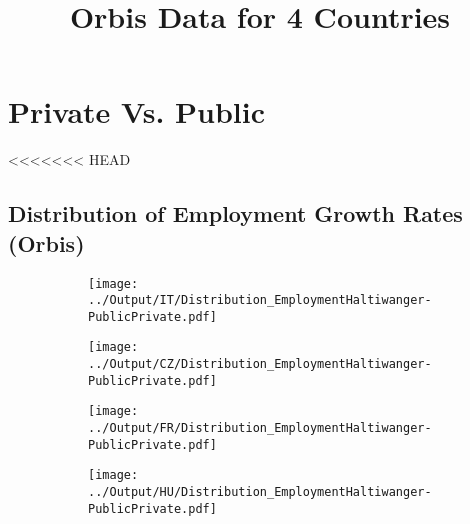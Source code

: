 \documentclass[12pt,notitlepage]{article}
\title{Orbis Data for 4 Countries}
\author{}
\date{}
\begin{document}
\maketitle
\tableofcontents
\pagebreak



\FloatBarrier
\section{Private Vs. Public} %
\label{sec:private_vs_public}
\FloatBarrier


<<<<<<< HEAD


\subsection{Distribution of Employment Growth Rates (Orbis)}
\begin{figure}[!htpb]
\centering
\begin{subfigure}{.49\textwidth}
    \centering
 \texttt{[image: ../Output/IT/Distribution\_EmploymentHaltiwanger-PublicPrivate.pdf]}
\end{subfigure}%
\begin{subfigure}{.49\textwidth}
    \centering
 \texttt{[image: ../Output/CZ/Distribution\_EmploymentHaltiwanger-PublicPrivate.pdf]}
\end{subfigure}
\begin{subfigure}{.49\textwidth}
    \centering
 \texttt{[image: ../Output/FR/Distribution\_EmploymentHaltiwanger-PublicPrivate.pdf]}
\end{subfigure}%
\begin{subfigure}{.49\textwidth}
    \centering
 \texttt{[image: ../Output/HU/Distribution\_EmploymentHaltiwanger-PublicPrivate.pdf]}
\end{subfigure}
\end{figure}
\end{document}
